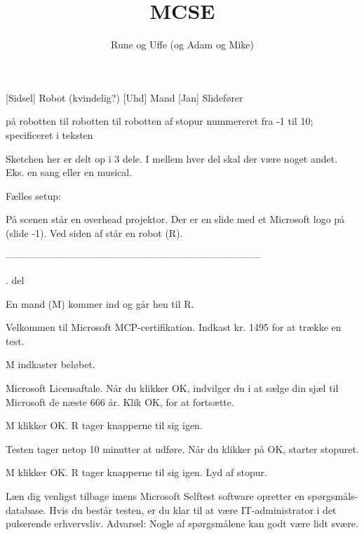 \documentclass[danish]{article}
\title{MCSE}
\author{Rune og Uffe (og Adam og Mike)}
\begin{document}
\maketitle

\begin{roles}
  [Sidsel] Robot (kvindelig?)
  [Uhd] Mand
  [Jan] Slidefører
\end{roles}

\begin{props}
   på robotten
   til robotten
   til robotten
   af stopur
   nummereret fra -1 til 10; specificeret i teksten
\end{props}

\begin{sketch}
  
\scene Sketchen her er delt op i 3 dele. I mellem hver del skal der være noget
andet. Eks. en sang eller en musical.

\scene Fælles setup:

\scene På scenen står en overhead projektor. Der er en slide med et Microsoft
logo på (slide -1). Ved siden af står en robot (R).

\scene ------------------------------------------------------------------------------

. del

\scene En mand (M) kommer ind og går hen til R.

 Velkommen til Microsoft MCP-certifikation. Indkast kr. 1495 for at
trække en test.

\scene M indkaster beløbet.

 Microsoft Licensaftale. Når du klikker OK, indvilger du i at sælge din
sjæl til Microsoft de næste 666 år. Klik OK, for at fortsætte. 

\scene M klikker OK. R tager knapperne til sig igen.

 Testen tager netop 10 minutter at udføre. Når du klikker på OK, starter
stopuret. 

\scene M klikker OK. R tager knapperne til sig igen. Lyd af stopur.

 Læn dig venligst tilbage imens Microsoft Selftest software opretter en
spørgsmåls-database. Hvis du består testen, er du klar til at være
IT-administrator i det pulserende erhvervsliv. Advarsel: Nogle af spørgsmålene
kan godt være lidt svære.


\end{sketch}
\end{document}
